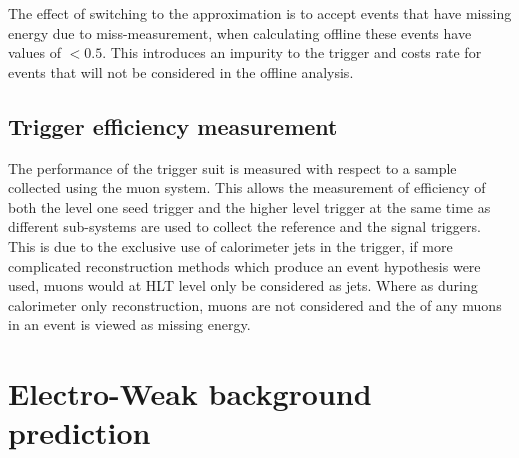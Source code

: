 The effect of switching to the \bt approximation is to accept events that have missing energy due to miss-measurement, when calculating \alt offline these events have values of \alt $< 0.5$. This introduces an impurity to the trigger and costs rate for events that will not be considered in the offline analysis.









\subsection{Trigger efficiency measurement} %
\label{sub:trigger_efficiency_measurement}





The performance of the \alt trigger suit is measured with respect to a sample collected using the muon system. This allows the measurement of efficiency of both the level one seed trigger and the higher level trigger at the same time as different sub-systems are used to collect the reference and the signal triggers. This is due to the exclusive use of calorimeter jets in the \alt trigger, if more complicated reconstruction methods which produce an event hypothesis were used, muons would at HLT level only be considered as jets. Where as during calorimeter only reconstruction, muons are not considered and the \pt of any muons in an event is viewed as missing energy.





\section{Electro-Weak background prediction} %
\label{sec:electro_weak_background_prediction}


